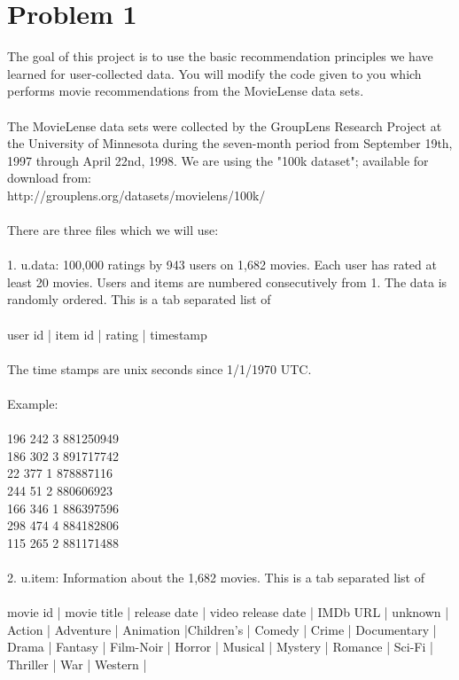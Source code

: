\documentclass[10pt,letterpaper]{article}
\begin{document}
\section{Problem 1}
The goal of this project is to use the basic recommendation principles we have learned for user-collected data. You will modify the code given to you which performs movie recommendations from the MovieLense data sets.\\
\\
The MovieLense data sets were collected by the GroupLens Research Project at the University of Minnesota during the seven-month period from September 19th, 1997 through April 22nd, 1998.  We are using the "100k dataset"; available for download from:\\
http://grouplens.org/datasets/movielens/100k/\\
\\
There are three files which we will use:\\
\\
1.  u.data: 100,000 ratings by 943 users on 1,682 movies. Each user has rated at least 20 movies. Users and items are numbered consecutively from 1. The data is randomly ordered. This is a tab separated list of\\ 
\\
user id | item id | rating | timestamp\\
\\
The time stamps are unix seconds since 1/1/1970 UTC.\\
\\
Example:\\
\\
196     242     3       881250949\\
186     302     3       891717742\\
22      377     1       878887116\\
244     51      2       880606923\\
166     346     1       886397596\\
298     474     4       884182806\\
115     265     2       881171488\\
\\
2.  u.item: Information about the 1,682 movies. This is a tab separated list of\\
\\
movie id | movie title | release date | video release date | IMDb URL | unknown | Action | Adventure | Animation |Children's | Comedy | Crime | Documentary | Drama | Fantasy | Film-Noir | Horror | Musical | Mystery | Romance | Sci-Fi | Thriller | War | Western |\\
\end{document}
